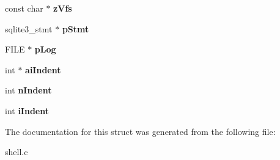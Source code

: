 \begin{DoxyCompactItemize}
\item 
const char $\ast$ {\bfseries z\+Vfs}\hypertarget{structShellState_a7a17ec105e801f6d466f3dd8e29521e6}{}\label{structShellState_a7a17ec105e801f6d466f3dd8e29521e6}

\item 
sqlite3\+\_\+stmt $\ast$ {\bfseries p\+Stmt}\hypertarget{structShellState_a443b930c7001c9b669728b917c2f5587}{}\label{structShellState_a443b930c7001c9b669728b917c2f5587}

\item 
F\+I\+LE $\ast$ {\bfseries p\+Log}\hypertarget{structShellState_a9ca42a0d7bf19e576de8ea13ba40b61c}{}\label{structShellState_a9ca42a0d7bf19e576de8ea13ba40b61c}

\item 
int $\ast$ {\bfseries ai\+Indent}\hypertarget{structShellState_a0481fdd4a0c88fb17f1a66ba87939ce9}{}\label{structShellState_a0481fdd4a0c88fb17f1a66ba87939ce9}

\item 
int {\bfseries n\+Indent}\hypertarget{structShellState_a73e3fe627474f4de6c0e04837ee0b0bd}{}\label{structShellState_a73e3fe627474f4de6c0e04837ee0b0bd}

\item 
int {\bfseries i\+Indent}\hypertarget{structShellState_a08d5d59ae0d44497aca79e89a5b8f0fe}{}\label{structShellState_a08d5d59ae0d44497aca79e89a5b8f0fe}

\end{DoxyCompactItemize}


The documentation for this struct was generated from the following file\+:\begin{DoxyCompactItemize}
\item 
shell.\+c\end{DoxyCompactItemize}
